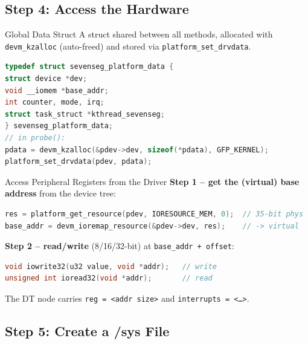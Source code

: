 \subsection{Step 4: Access the Hardware}

\begin{definition}{Global Data Struct}
    A struct shared between all methods, allocated with \texttt{devm\_kzalloc}
    (auto-freed) and stored via \texttt{platform\_set\_drvdata}.
\begin{lstlisting}[language=C, style=basesmol, aboveskip=2pt, belowskip=2pt]
typedef struct sevenseg_platform_data {
struct device *dev;
void __iomem *base_addr;
int counter, mode, irq;
struct task_struct *kthread_sevenseg;
} sevenseg_platform_data;
// in probe():
pdata = devm_kzalloc(&pdev->dev, sizeof(*pdata), GFP_KERNEL);
platform_set_drvdata(pdev, pdata);
\end{lstlisting}
\end{definition}

\begin{KR}{Access Peripheral Registers from the Driver}
    \textbf{Step 1 -- get the (virtual) base address} from the device tree:
\begin{lstlisting}[language=C, style=basesmol, aboveskip=2pt, belowskip=2pt]
res = platform_get_resource(pdev, IORESOURCE_MEM, 0);  // 35-bit phys
base_addr = devm_ioremap_resource(&pdev->dev, res);    // -> virtual
\end{lstlisting}
    \textbf{Step 2 -- read/write} (8/16/32-bit) at \texttt{base\_addr + offset}:
\begin{lstlisting}[language=C, style=basesmol, aboveskip=2pt, belowskip=2pt]
void iowrite32(u32 value, void *addr);   // write
unsigned int ioread32(void *addr);       // read
\end{lstlisting}
    The DT node carries \texttt{reg = <addr size>} and \texttt{interrupts = <\dots>}.
\end{KR}

\subsection{Step 5: Create a /sys File}

